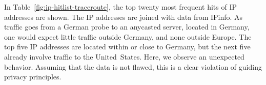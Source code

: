 In Table~\ref{fig:ip-hitlist-traceroute}, the top twenty most frequent hits of
IP addresses are shown. The IP addresses are joined with data from IPinfo. As
traffic goes from a German probe to an anycasted server, located in Germany,
one would expect little traffic outside Germany, and none outside Europe. The
top five IP addresses are located within or close to Germany, but the next five
already involve traffic to the United~States. Here, we observe an unexpected
behavior. Assuming that the data is not flawed, this is a clear violation of
guiding privacy principles.


